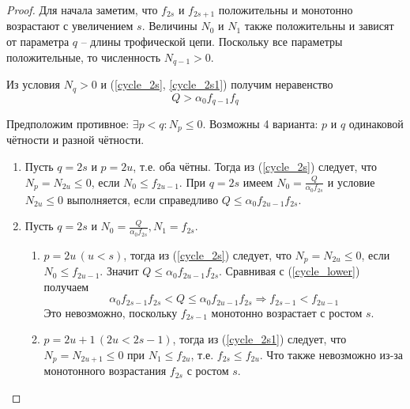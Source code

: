         \begin{proof}
            Для начала заметим, что \(f_{2s}\) и \(f_{2s+1}\) положительны и монотонно возрастают с увеличением \(s\). Величины \(N_0\) и \(N_1\) также положительны и зависят от параметра \(q\) -- длины трофической цепи.  
            Поскольку все параметры положительные, то численность \( N_{q-1} > 0 \).

            Из условия \( N_q > 0 \) и (\ref{cycle_2s}, \ref{cycle_2s1}) получим неравенство
            \begin{equation} \label{cycle_lower}
                Q > \alpha_0 f_{q-1} f_{q}
            \end{equation} 

            Предположим противное: \(\exists p < q : N_p \leq 0\). Возможны 4 варианта: \(p\) и \(q\) одинаковой чётности и разной чётности.

            \begin{enumerate}
                \item Пусть \(q = 2s\) и \(p = 2u\), т.е. оба чётны. Тогда из (\ref{cycle_2s}) следует, что \( N_p = N_{2u} \leq 0 \), если \(N_0 \leq f_{2u-1}\). При \(q = 2s \) имеем \( N_0 = \frac{Q}{\alpha_0 f_{2s}}\) и условие \(N_{2u} \leq 0\) выполняется, если справедливо \(Q \leq \alpha_0 f_{2u-1} f_{2s} \).
                
                \item Пусть \(q = 2s \) и \( N_0 = \frac{Q}{\alpha_0 f_{2s}}, N_1 = f_{2s}\).
                \begin{enumerate}
                    \item \(p = 2u \, (u < s)\), тогда из (\ref{cycle_2s}) следует, что \( N_p = N_{2u} \leq 0 \), если \(N_0 \leq f_{2u-1}\). Значит \(Q \leq \alpha_0 f_{2u-1} f_{2s} \). Сравнивая с (\ref{cycle_lower}) получаем
                    \begin{equation*}
                        \alpha_0 f_{2s-1} f_{2s} < Q \leq \alpha_0 f_{2u-1} f_{2s} \Rightarrow f_{2s-1} < f_{2u-1}
                    \end{equation*}
                    Это невозможно, поскольку \(f_{2s-1}\) монотонно возрастает с ростом \(s\).

                    \item \(p = 2u+1 \, (2u < 2s-1)\), тогда из (\ref{cycle_2s1}) следует, что \( N_p = N_{2u+1} \leq 0 \) при \(N_1 \leq f_{2u}\), т.е. \(f_{2s} \leq f_{2u} \). Что также невозможно из-за монотонного возрастания \(f_{2s}\) с ростом \(s\). 
                \end{enumerate}


\end{enumerate}
\end{proof}
